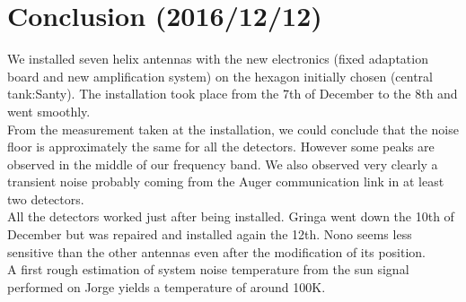 \clearpage
\section*{Conclusion (2016/12/12)}
We  installed seven  helix antennas  with the  new  electronics (fixed
adaptation  board  and  new   amplification  system)  on  the  hexagon
initially  chosen (central  tank:Santy). The  installation  took place
from the  7th of December to the  8th and went smoothly.   \\ From the
measurement  taken at  the installation,  we could  conclude  that the
noise floor is  approximately the same for all  the detectors. However
some peaks are observed in the  middle of our frequency band.  We also
observed very clearly a transient noise probably coming from the Auger
communication  link in at  least two  detectors.  \\All  the detectors
worked  just after  being installed.   Gringa  went down  the 10th  of
December but  was repaired and  installed again the 12th.   Nono seems
less sensitive than the other  antennas even after the modification of
its position.  \\A first rough estimation of  system noise temperature
from the sun signal performed  on Jorge yields a temperature of around
100K.
\begin{figure}[ht!]
  \centering
  \hspace*{-3ex}
  \label{fig:monit}
\end{figure}


